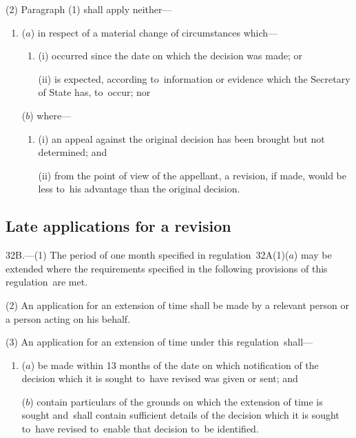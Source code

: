 \documentclass[12pt,a4paper]{article}
\begin{document}
(2) Paragraph (1) shall apply neither---
\begin{enumerate}\item[]
\begin{sloppypar}
($a$) in respect of a material change of circumstances which—
\end{sloppypar}
\begin{enumerate}\item[]
(i) occurred since 
the date on which the decision was made;  %
or

(ii) is expected, according to~information or evidence which the Secretary of State has, to~occur; nor
\end{enumerate}

($b$) where---
\begin{enumerate}\item[]
(i) an appeal against the original decision has been brought but not determined; and

(ii) from the point of view of the appellant, a revision, if made, would be less to~his advantage than the original decision.
\end{enumerate}
\end{enumerate}


\subsection[32B. Late applications for a revision]{Late applications for a revision}

32B.—(1) The period of one month specified in regulation~32A(1)($a$) may be extended where the requirements specified in the following provisions of this regulation~are met.

(2) An application for an extension of time shall be made by a relevant person or a person acting on his behalf.

(3) An application for an extension of time under this regulation~shall---
\begin{enumerate}\item[]
($a$) be made within 13 months of the date on which notification of the decision which it is sought to~have revised was given or sent; and

($b$) contain particulars of the grounds on which the extension of time is sought and~shall contain sufficient details of the decision which it is sought to~have revised to~enable that decision to~be identified.
\end{enumerate}
\end{document}
